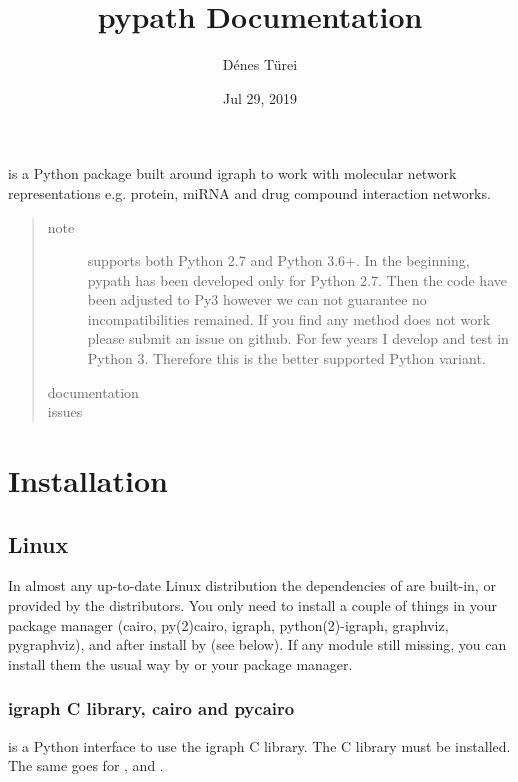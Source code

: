 \documentclass[letterpaper,10pt,english]{sphinxmanual}
\title{pypath Documentation}
\date{Jul 29, 2019}
\author{Dénes Türei}
\begin{document}
\pagestyle{empty}
\sphinxmaketitle
\pagestyle{plain}
\sphinxtableofcontents
\pagestyle{normal}
\label{\detokenize{index::doc}}


 is a Python package built around igraph to work with molecular
network representations e.g. protein, miRNA and drug compound interaction
networks.
\begin{quote}\begin{description}
\item[{note}] \leavevmode
{} supports both Python 2.7 and Python 3.6+. In the beginning,
pypath has been developed only for Python 2.7. Then the code have been
adjusted to Py3 however we can not guarantee no incompatibilities
remained. If you find any method does not work please submit an issue on
github. For few years I develop and test  in Python 3. Therefore
this is the better supported Python variant.

\item[{documentation}] \leavevmode
{}

\item[{issues}] \leavevmode
{}

\end{description}\end{quote}


\chapter{Installation}
\label{\detokenize{installation:installation}}\label{\detokenize{installation::doc}}

\section{Linux}
\label{\detokenize{installation:linux}}
In almost any up-to-date Linux distribution the dependencies of  are
built-in, or provided by the distributors. You only need to install a couple
of things in your package manager (cairo, py(2)cairo, igraph,
python(2)-igraph, graphviz, pygraphviz), and after install  by 
(see below). If any module still missing, you can install them the usual way
by  or your package manager.


\subsection{igraph C library, cairo and pycairo}
\label{\detokenize{installation:igraph-c-library-cairo-and-pycairo}}
 is a Python interface to use the igraph C library. The
C library must be installed. The same goes for ,  and
.
\end{document}
